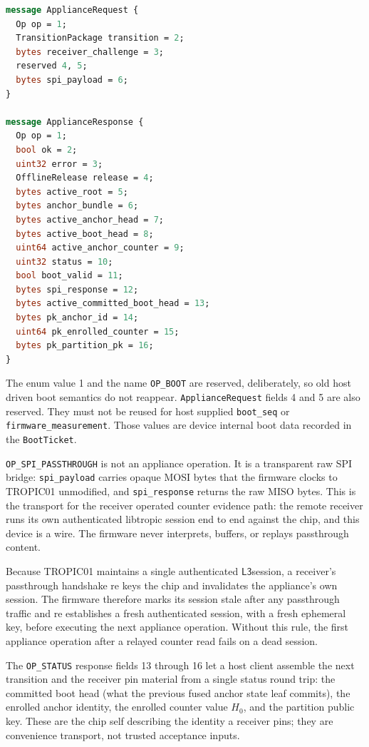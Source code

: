 \documentclass[11pt]{article}
\theoremstyle{definition}
\theoremstyle{remark}
\newcommand{\Lthree}{\ensuremath{\mathsf{L3}}}
\begin{document}
\begin{lstlisting}[language=proto]
message ApplianceRequest {
  Op op = 1;
  TransitionPackage transition = 2;
  bytes receiver_challenge = 3;
  reserved 4, 5;
  bytes spi_payload = 6;
}

message ApplianceResponse {
  Op op = 1;
  bool ok = 2;
  uint32 error = 3;
  OfflineRelease release = 4;
  bytes active_root = 5;
  bytes anchor_bundle = 6;
  bytes active_anchor_head = 7;
  bytes active_boot_head = 8;
  uint64 active_anchor_counter = 9;
  uint32 status = 10;
  bool boot_valid = 11;
  bytes spi_response = 12;
  bytes active_committed_boot_head = 13;
  bytes pk_anchor_id = 14;
  uint64 pk_enrolled_counter = 15;
  bytes pk_partition_pk = 16;
}
\end{lstlisting}

The enum value 1 and the name \texttt{OP\_BOOT} are reserved, deliberately, so old host driven
boot semantics do not reappear. \texttt{ApplianceRequest} fields 4 and 5 are also reserved. They
must not be reused for host supplied \texttt{boot\_seq} or \texttt{firmware\_measurement}. Those
values are device internal boot data recorded in the \texttt{BootTicket}.

\texttt{OP\_SPI\_PASSTHROUGH} is not an appliance operation. It is a transparent raw SPI bridge:
\texttt{spi\_payload} carries opaque MOSI bytes that the firmware clocks to TROPIC01 unmodified,
and \texttt{spi\_response} returns the raw MISO bytes. This is the transport for the receiver
operated counter evidence path: the remote receiver runs its own authenticated libtropic session
end to end against the chip, and this device is a wire. The firmware never interprets, buffers,
or replays passthrough content.

Because TROPIC01 maintains a single authenticated \Lthree session, a receiver's passthrough
handshake re keys the chip and invalidates the appliance's own session. The firmware therefore
marks its session stale after any passthrough traffic and re establishes a fresh authenticated
session, with a fresh ephemeral key, before executing the next appliance operation. Without this
rule, the first appliance operation after a relayed counter read fails on a dead session.

The \texttt{OP\_STATUS} response fields 13 through 16 let a host client assemble the next
transition and the receiver pin material from a single status round trip: the committed boot head
(what the previous fused anchor state leaf commits), the enrolled anchor identity, the enrolled
counter value \(H_0\), and the partition public key. These are the chip self describing the
identity a receiver pins; they are convenience transport, not trusted acceptance inputs.
\end{document}
